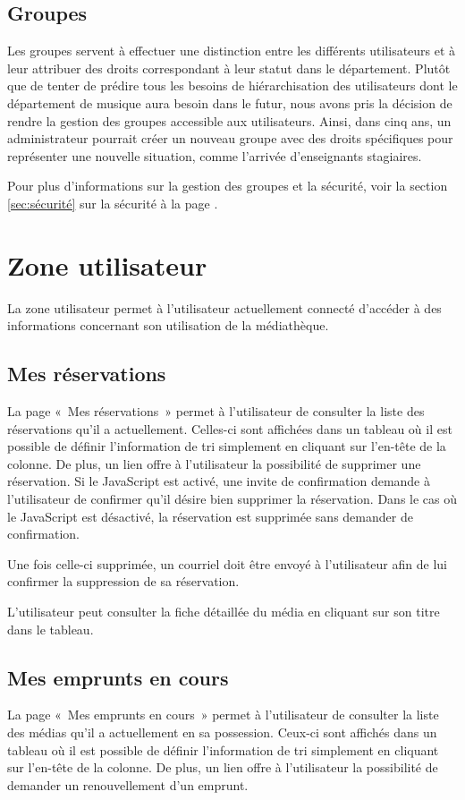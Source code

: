 \documentclass[letter, 11pt]{report}
\begin{document}
\subsection{Groupes}
Les groupes servent à effectuer une distinction entre les différents utilisateurs et à leur attribuer des droits correspondant à leur statut dans le département. Plutôt que de tenter de prédire tous les besoins de hiérarchisation des utilisateurs dont le département de musique aura besoin dans le futur, nous avons pris la décision de rendre la gestion des groupes accessible aux utilisateurs. Ainsi, dans cinq ans, un administrateur pourrait créer un nouveau groupe avec des droits spécifiques pour représenter une nouvelle situation, comme l'arrivée d'enseignants stagiaires.

Pour plus d'informations sur la gestion des groupes et la sécurité, voir la section \ref{sec:sécurité} sur la sécurité à la page \pageref{sec:sécurité}.

\section{Zone utilisateur}
La zone utilisateur permet à l'utilisateur actuellement connecté d'accéder à des informations concernant son utilisation de la médiathèque.

\subsection{Mes réservations}
La page «~Mes réservations~» permet à l'utilisateur de consulter la liste des réservations qu'il a actuellement. Celles-ci sont affichées dans un tableau où il est possible de définir l'information de tri simplement en cliquant sur l'en-tête de la colonne. De plus, un lien offre à l'utilisateur la possibilité de supprimer une réservation. Si le JavaScript est activé, une invite de confirmation demande à l'utilisateur de confirmer qu'il désire bien supprimer la réservation. Dans le cas où le JavaScript est désactivé, la réservation est supprimée sans demander de confirmation.

Une fois celle-ci supprimée, un courriel doit être envoyé à l'utilisateur afin de lui confirmer la suppression de sa réservation.

L'utilisateur peut consulter la fiche détaillée du média en cliquant sur son titre dans le tableau.

\subsection{Mes emprunts en cours}
La page «~Mes emprunts en cours~» permet à l'utilisateur de consulter la liste des médias qu'il a actuellement en sa possession. Ceux-ci sont affichés dans un tableau où il est possible de définir l'information de tri simplement en cliquant sur l'en-tête de la colonne. De plus, un lien offre à l'utilisateur la possibilité de demander un renouvellement d'un emprunt.
\end{document}
